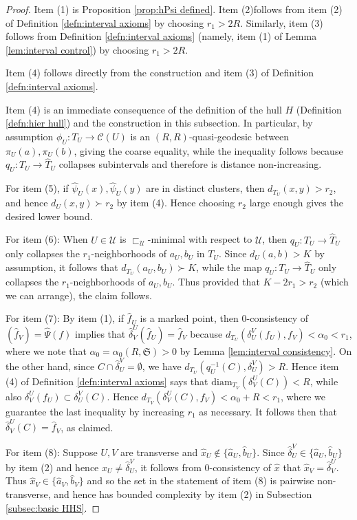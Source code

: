 \documentclass{amsart}
\theoremstyle{definition}
\theoremstyle{remark}
\theoremstyle{definition}
\newcommand{\calC}{\mathcal{C}}
\newcommand{\calU}{\mathcal{U}}
\newcommand{\hT}{\widehat{T}}
\newcommand{\hx}{\hat{x}}
\newcommand{\ha}{\hat{a}}
\newcommand{\hb}{\hat{b}}
\newcommand{\hd}{\hat{\delta}}
\newcommand{\hpsi}{\hat{\psi}}
\newcommand{\hPsi}{\widehat{\Psi}}
\newcommand{\hf}{\hat{f}}
\newcommand{\diam}{\mathrm{diam}}
\newcommand{\nest}{\sqsubset}
\begin{document}
\begin{proof}
Item (1) is  Proposition \ref{prop:hPsi defined}.  Item (2)follows from item (2) of Definition \ref{defn:interval axioms} by choosing $r_1>2R$.  Similarly, item (3) follows from Definition \ref{defn:interval axioms} (namely, item (1) of Lemma \ref{lem:interval control}) by choosing $r_1 > 2R$.  

Item (4) follows directly from the construction and item (3) of Definition \ref{defn:interval axioms}.

Item (4) is an immediate consequence of the definition of the hull $H$ (Definition \ref{defn:hier hull}) and the construction in this subsection.  In particular, by assumption $\phi_U:T_U \to \calC(U)$ is an $(R,R)$-quasi-geodesic between $\pi_U(a), \pi_U(b)$, giving the coarse equality, while the inequality follows because $q_U:T_U\to \hT_U$ collapses subintervals and therefore is distance non-increasing.


For item (5), if $\hpsi_U(x),\hpsi_U(y)$ are in distinct clusters, then $d_{T_U}(x,y) > r_2$, and hence $d_U(x,y) \succ r_2$ by item (4).  Hence choosing $r_2$ large enough gives the desired lower bound.

For item (6): When $U \in \calU$ is $\nest_{\calU}$-minimal with respect to $\calU$, then $q_U:T_U \to \hT_U$ only collapses the $r_1$-neighborhoods of $a_U,b_U$ in $T_U$.  Since $d_U(a,b)>K$ by assumption, it follows that $d_{T_U}(a_U,b_U) \succ K$, while the map $q_U:T_U \to \hT_U$ only collapses the $r_1$-neighborhoods of $a_U,b_U$.  Thus provided that $K -2r_1 > r_2$ (which we can arrange), the claim follows.



For item (7): By item (1), if $\hf_U$ is a marked point, then $0$-consistency of $(\hf_V) = \hPsi(f)$ implies that $\hd^U_V(\hf_U) = \hf_V$ because $d_{T_U}(\delta^V_U(f_U),f_V)<\alpha_0 < r_1$, where we note that $\alpha_0 = \alpha_0(R, \mathfrak S)>0$ by Lemma \ref{lem:interval consistency}.  On the other hand, since $C \cap \hd^V_U = \emptyset$, we have $d_{T_U}(q^{-1}_U(C), \delta^V_U)>R$.  Hence item (4) of Definition \ref{defn:interval axioms} says that $\diam_{T_V}(\delta^U_V(C))<R$, while also $\delta^U_V(f_U) \subset \delta^V_U(C)$.  Hence $d_{T_V}(\delta^U_V(C), f_V)<\alpha_0 + R<r_1$, where we guarantee the last inequality by increasing $r_1$ as necessary.  It follows then that $\hd^U_V(C) = \hf_V$, as claimed.



For item (8): Suppose $U, V$ are transverse and $\hx_U \notin  \{\ha_U, \hb_U\}$.  Since $\hd^V_U \in \{\ha_U,\hb_U\}$ by item (2) and hence $\hx_U \neq \hd^V_U$, it follows from $0$-consistency of $\hx$ that $\hx_V = \hd^U_V$.  Thus $\hx_V \in \{\ha_V,\hb_V\}$ and so the set in the statement of item (8) is pairwise non-transverse, and hence has bounded complexity by item (2) in Subsection \ref{subsec:basic HHS}.


\end{proof}
\end{document}
